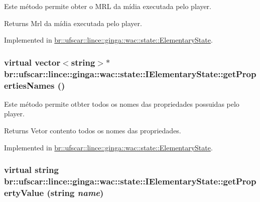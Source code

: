 Este método permite obter o MRL da mídia executada pelo player. 

\begin{DoxyReturn}{Returns}
Mrl da mídia executada pelo player. 
\end{DoxyReturn}


Implemented in \hyperlink{classbr_1_1ufscar_1_1lince_1_1ginga_1_1wac_1_1state_1_1ElementaryState_a3714512e115e6e66bfa55eb5694951ec}{br::ufscar::lince::ginga::wac::state::ElementaryState}.

\hypertarget{classbr_1_1ufscar_1_1lince_1_1ginga_1_1wac_1_1state_1_1IElementaryState_a68c7e2ba58623cea860d6de1fc7112e7}{
\subsubsection[{getPropertiesNames}]{\setlength{\rightskip}{0pt plus 5cm}virtual vector$<$string$>$$\ast$ br::ufscar::lince::ginga::wac::state::IElementaryState::getPropertiesNames ()}}
\label{classbr_1_1ufscar_1_1lince_1_1ginga_1_1wac_1_1state_1_1IElementaryState_a68c7e2ba58623cea860d6de1fc7112e7}


Este método permite otbter todos os nomes das propriedades possuidas pelo player. 

\begin{DoxyReturn}{Returns}
Vetor contento todos os nomes das propriedades. 
\end{DoxyReturn}


Implemented in \hyperlink{classbr_1_1ufscar_1_1lince_1_1ginga_1_1wac_1_1state_1_1ElementaryState_a135050e832afa82aeff759a54087031b}{br::ufscar::lince::ginga::wac::state::ElementaryState}.

\hypertarget{classbr_1_1ufscar_1_1lince_1_1ginga_1_1wac_1_1state_1_1IElementaryState_a01bae35ea4efe31c179e81db8fb8a126}{
\subsubsection[{getPropertyValue}]{\setlength{\rightskip}{0pt plus 5cm}virtual string br::ufscar::lince::ginga::wac::state::IElementaryState::getPropertyValue (string {\em name})}}
\label{classbr_1_1ufscar_1_1lince_1_1ginga_1_1wac_1_1state_1_1IElementaryState_a01bae35ea4efe31c179e81db8fb8a126}


